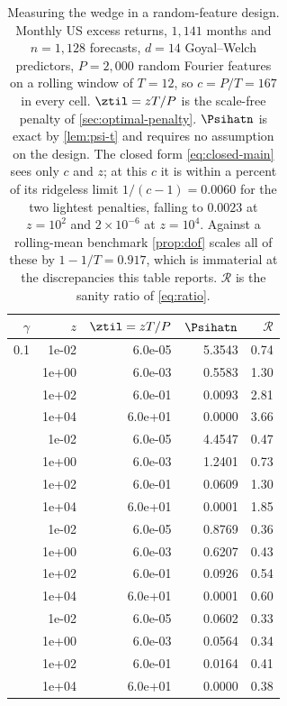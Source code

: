 \begin{table}[htbp]
\centering
\caption{Measuring the wedge in a random-feature design. Monthly US excess returns, $1{,}141$ months and $n=1{,}128$ forecasts, $d=14$ Goyal--Welch predictors, $P=2,000$ random Fourier features on a rolling window of $T=12$, so $c=P/T=167$ in every cell. $\ztil=zT/P$ is the scale-free penalty of \cref{sec:optimal-penalty}. $\Psihatn$ is exact by \cref{lem:psi-t} and requires no assumption on the design. The closed form \eqref{eq:closed-main} sees only $c$ and $z$; at this $c$ it is within a percent of its ridgeless limit $1/(c-1)=0.0060$ for the two lightest penalties, falling to $0.0023$ at $z=10^2$ and $2\times10^{-6}$ at $z=10^4$. Against a rolling-mean benchmark \cref{prop:dof} scales all of these by $1-1/T=0.917$, which is immaterial at the discrepancies this table reports. $\mathcal R$ is the sanity ratio of \cref{eq:ratio}.}
\label{tab:voc-psi}
\small
\begin{tabular}{rrrrr}
\toprule
$\gamma$ & $z$ & $\ztil=zT/P$ & $\Psihatn$ & $\mathcal R$ \\
\midrule
0.1 & 1e-02 & 6.0e-05 & 5.3543 & 0.74 \\
 & 1e+00 & 6.0e-03 & 0.5583 & 1.30 \\
 & 1e+02 & 6.0e-01 & 0.0093 & 2.81 \\
 & 1e+04 & 6.0e+01 & 0.0000 & 3.66 \\
\addlinespace
0.3 & 1e-02 & 6.0e-05 & 4.4547 & 0.47 \\
 & 1e+00 & 6.0e-03 & 1.2401 & 0.73 \\
 & 1e+02 & 6.0e-01 & 0.0609 & 1.30 \\
 & 1e+04 & 6.0e+01 & 0.0001 & 1.85 \\
\addlinespace
1.0 & 1e-02 & 6.0e-05 & 0.8769 & 0.36 \\
 & 1e+00 & 6.0e-03 & 0.6207 & 0.43 \\
 & 1e+02 & 6.0e-01 & 0.0926 & 0.54 \\
 & 1e+04 & 6.0e+01 & 0.0001 & 0.60 \\
\addlinespace
3.0 & 1e-02 & 6.0e-05 & 0.0602 & 0.33 \\
 & 1e+00 & 6.0e-03 & 0.0564 & 0.34 \\
 & 1e+02 & 6.0e-01 & 0.0164 & 0.41 \\
 & 1e+04 & 6.0e+01 & 0.0000 & 0.38 \\
\bottomrule
\end{tabular}
\end{table}

